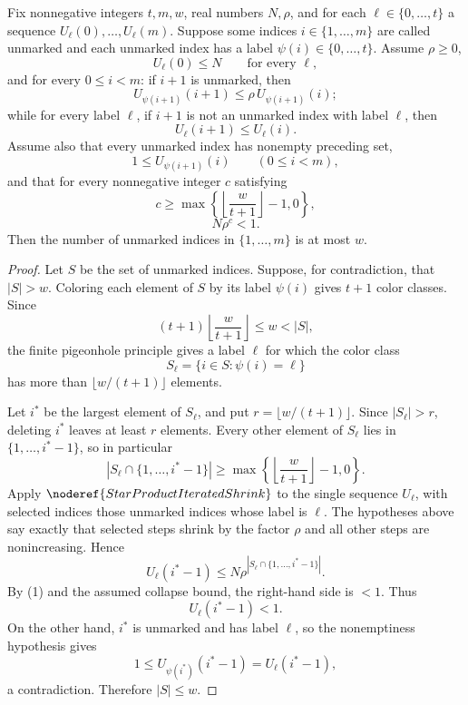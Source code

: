 \begin{helper}
Fix nonnegative integers \(t,m,w\), real numbers \(N,\rho\), and for each
\(\ell\in\{0,\ldots,t\}\) a sequence \(U_\ell(0),\ldots,U_\ell(m)\).  Suppose
some indices \(i\in\{1,\ldots,m\}\) are called unmarked and each unmarked
index has a label \(\psi(i)\in\{0,\ldots,t\}\).  Assume \(\rho\ge0\),
\[
  U_\ell(0)\le N\qquad\text{for every }\ell,
\]
and for every \(0\le i<m\):
if \(i+1\) is unmarked, then
\[
  U_{\psi(i+1)}(i+1)\le \rho\,U_{\psi(i+1)}(i);
\]
while for every label \(\ell\), if \(i+1\) is not an unmarked index with
label \(\ell\), then
\[
  U_\ell(i+1)\le U_\ell(i).
\]
Assume also that every unmarked index has nonempty preceding set,
\[
  1\le U_{\psi(i+1)}(i)
  \qquad(0\le i<m),
\]
and that for every nonnegative integer \(c\) satisfying
\[
  c\ge
  \max\left\{\left\lfloor\frac{w}{t+1}\right\rfloor-1,0\right\},
\]
\[
  N\rho^c<1.
\]
Then the number of unmarked indices in \(\{1,\ldots,m\}\) is at most \(w\).
\end{helper}
\begin{proof}
Let \(S\) be the set of unmarked indices.  Suppose, for contradiction, that
\(|S|>w\).  Coloring each element of \(S\) by its label \(\psi(i)\) gives
\(t+1\) color classes.  Since
\[
  (t+1)\left\lfloor\frac{w}{t+1}\right\rfloor\le w<|S|,
\]
the finite pigeonhole principle gives a label \(\ell\) for which the color
class
\[
  S_\ell=\{i\in S:\psi(i)=\ell\}
\]
has more than \(\lfloor w/(t+1)\rfloor\) elements.

Let \(i^*\) be the largest element of \(S_\ell\), and put
\(r=\lfloor w/(t+1)\rfloor\).  Since \(|S_\ell|>r\), deleting \(i^*\)
leaves at least \(r\) elements.  Every other element of \(S_\ell\) lies in
\(\{1,\ldots,i^*-1\}\), so in particular
\[
  |S_\ell\cap\{1,\ldots,i^*-1\}|
    \ge
    \max\left\{\left\lfloor\frac{w}{t+1}\right\rfloor-1,0\right\}. \tag{1}
\]
Apply \(\noderef{StarProductIteratedShrink}\) to the single sequence
\(U_\ell\), with selected indices those unmarked indices whose label is
\(\ell\).  The hypotheses above say exactly that selected steps shrink by
the factor \(\rho\) and all other steps are nonincreasing.  Hence
\[
  U_\ell(i^*-1)
  \le
  N\rho^{|S_\ell\cap\{1,\ldots,i^*-1\}|}.
\]
By (1) and the assumed collapse bound, the right-hand side is \(<1\).  Thus
\[
  U_\ell(i^*-1)<1.
\]
On the other hand, \(i^*\) is unmarked and has label \(\ell\), so the
nonemptiness hypothesis gives
\[
  1\le U_{\psi(i^*)}(i^*-1)=U_\ell(i^*-1),
\]
a contradiction.  Therefore \(|S|\le w\).
\end{proof}
